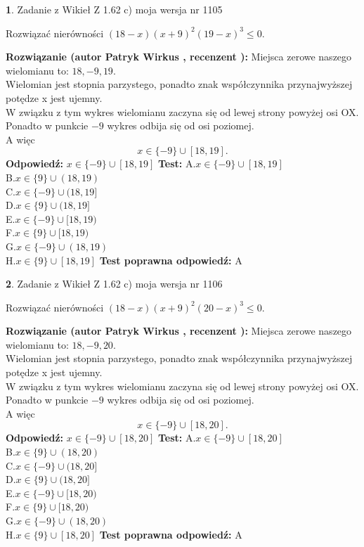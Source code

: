 \documentclass[12pt, a4paper]{article}
\theoremstyle{definition} %
\newtheorem{zad}{}
\newcommand{\zadStart}[1]{\begin{zad}#1\newline}
\newcommand{\zadStop}{\end{zad}}
\newcommand{\rozwStart}[2]{\noindent \textbf{Rozwiązanie (autor #1 , recenzent #2): }\newline}
\newcommand{\rozwStop}{\newline}
\newcommand{\odpStart}{\noindent \textbf{Odpowiedź:}\newline}
\newcommand{\odpStop}{\newline}
\newcommand{\testStart}{\noindent \textbf{Test:}\newline}
\newcommand{\testStop}{\newline}
\newcommand{\kluczStart}{\noindent \textbf{Test poprawna odpowiedź:}\newline}
\newcommand{\kluczStop}{\newline}
\begin{document}
\zadStart{Zadanie z Wikieł Z 1.62 c) moja wersja nr 1105}

Rozwiązać nierówności $(18-x)(x+9)^{2}(19-x)^{3}\le0$.
\zadStop
\rozwStart{Patryk Wirkus}{}
Miejsca zerowe naszego wielomianu to: $18, -9, 19$.\\
Wielomian jest stopnia parzystego, ponadto znak współczynnika przy\linebreak najwyższej potędze x jest ujemny.\\ W związku z tym wykres wielomianu zaczyna się od lewej strony powyżej osi OX.\\
Ponadto w punkcie $-9$ wykres odbija się od osi poziomej.\\
A więc $$x \in \{-9\} \cup [18,19].$$
\rozwStop
\odpStart
$x \in \{-9\} \cup [18,19]$
\odpStop
\testStart
A.$x \in \{-9\} \cup [18,19]$\\
B.$x \in \{9\} \cup (18,19)$\\
C.$x \in \{-9\} \cup (18,19]$\\
D.$x \in \{9\} \cup (18,19]$\\
E.$x \in \{-9\} \cup [18,19)$\\
F.$x \in \{9\} \cup [18,19)$\\
G.$x \in \{-9\} \cup (18,19)$\\
H.$x \in \{9\} \cup [18,19]$
\testStop
\kluczStart
A
\kluczStop



\zadStart{Zadanie z Wikieł Z 1.62 c) moja wersja nr 1106}

Rozwiązać nierówności $(18-x)(x+9)^{2}(20-x)^{3}\le0$.
\zadStop
\rozwStart{Patryk Wirkus}{}
Miejsca zerowe naszego wielomianu to: $18, -9, 20$.\\
Wielomian jest stopnia parzystego, ponadto znak współczynnika przy\linebreak najwyższej potędze x jest ujemny.\\ W związku z tym wykres wielomianu zaczyna się od lewej strony powyżej osi OX.\\
Ponadto w punkcie $-9$ wykres odbija się od osi poziomej.\\
A więc $$x \in \{-9\} \cup [18,20].$$
\rozwStop
\odpStart
$x \in \{-9\} \cup [18,20]$
\odpStop
\testStart
A.$x \in \{-9\} \cup [18,20]$\\
B.$x \in \{9\} \cup (18,20)$\\
C.$x \in \{-9\} \cup (18,20]$\\
D.$x \in \{9\} \cup (18,20]$\\
E.$x \in \{-9\} \cup [18,20)$\\
F.$x \in \{9\} \cup [18,20)$\\
G.$x \in \{-9\} \cup (18,20)$\\
H.$x \in \{9\} \cup [18,20]$
\testStop
\kluczStart
A
\kluczStop
\end{document}
